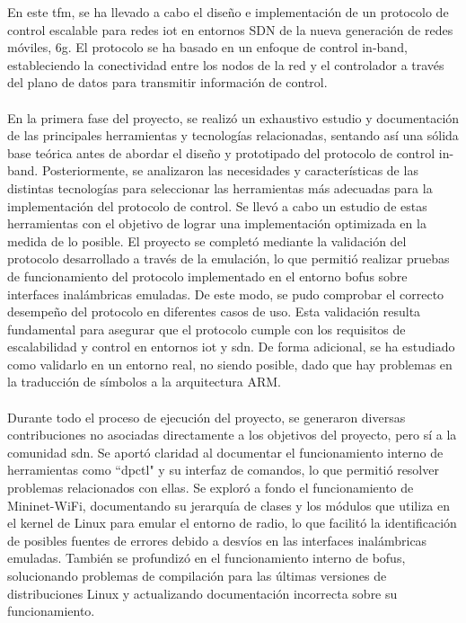 En este \gls{tfm}, se ha llevado a cabo el diseño e implementación de un protocolo de control escalable para redes \gls{iot} en entornos SDN de la nueva generación de redes móviles, \gls{6g}. El protocolo se ha basado en un enfoque de control in-band, estableciendo la conectividad entre los nodos de la red y el controlador a través del plano de datos para transmitir información de control.\\
\\
En la primera fase del proyecto, se realizó un exhaustivo estudio y documentación de las principales herramientas y tecnologías relacionadas, sentando así una sólida base teórica antes de abordar el diseño y prototipado del protocolo de control in-band. Posteriormente, se analizaron las necesidades y características de las distintas tecnologías para seleccionar las herramientas más adecuadas para la implementación del protocolo de control. Se llevó a cabo un estudio de estas herramientas con el objetivo de lograr una implementación optimizada en la medida de lo posible.  El proyecto se completó mediante la validación del protocolo desarrollado a través de la emulación, lo que permitió realizar pruebas de funcionamiento del protocolo implementado en el entorno \gls{bofus} sobre interfaces inalámbricas emuladas. De este modo, se pudo comprobar el correcto desempeño del protocolo en diferentes casos de uso. Esta validación resulta fundamental para asegurar que el protocolo cumple con los requisitos de escalabilidad y control en entornos \gls{iot} y \gls{sdn}. De forma adicional, se ha estudiado como validarlo en un entorno real, no siendo posible, dado que hay problemas en la traducción de símbolos a la arquitectura ARM.\\
\\
Durante todo el proceso de ejecución del proyecto, se generaron diversas contribuciones no asociadas directamente a los objetivos del proyecto, pero sí a la comunidad \gls{sdn}. Se aportó claridad al documentar el funcionamiento interno de herramientas como ``dpctl" y su interfaz de comandos, lo que permitió resolver problemas relacionados con ellas. Se exploró a fondo el funcionamiento de Mininet-WiFi, documentando su jerarquía de clases y los módulos que utiliza en el kernel de Linux para emular el entorno de radio, lo que facilitó la identificación de posibles fuentes de errores debido a desvíos en las interfaces inalámbricas emuladas. También se profundizó en el funcionamiento interno de \gls{bofus}, solucionando problemas de compilación para las últimas versiones de distribuciones Linux y actualizando documentación incorrecta sobre su funcionamiento.\\
